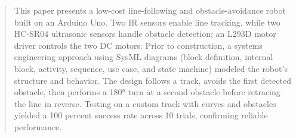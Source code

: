 \begin{abstract}
This paper presents a low-cost line-following and obstacle-avoidance robot built on an Arduino Uno. Two IR sensors enable line tracking, while two HC-SR04 ultrasonic sensors handle obstacle detection; an L293D motor driver controls the two DC motors. Prior to construction, a systems engineering approach using SysML diagrams (block definition, internal block, activity, sequence, use case, and state machine) modeled the robot's structure and behavior. The design follows a track, avoids the first detected obstacle, then performs a 180° turn at a second obstacle before retracing the line in reverse. Testing on a custom track with curves and obstacles yielded a 100 percent success rate across 10 trials, confirming reliable performance.
\end{abstract}


